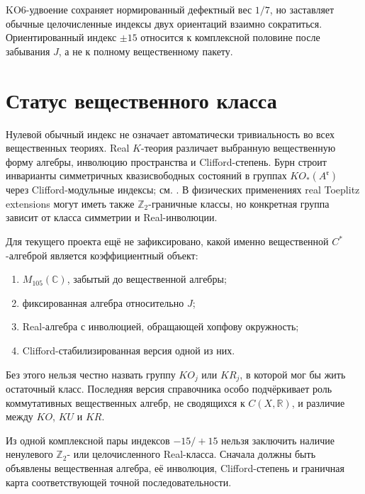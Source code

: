 \begin{proposition}
KO6-удвоение сохраняет нормированный дефектный вес $1/7$, но заставляет
обычные целочисленные индексы двух ориентаций взаимно сократиться.
Ориентированный индекс $\pm15$ относится к комплексной половине после
забывания $J$, а не к полному вещественному пакету.
\end{proposition}

\section{Статус вещественного класса}

Нулевой обычный индекс не означает автоматически тривиальность во всех
вещественных теориях. Real $K$-теория различает выбранную вещественную
форму алгебры, инволюцию пространства и Clifford-степень. Бурн строит
инварианты симметричных квазисвободных состояний в группах
$KO_*(A^{\mathfrak r})$ через Clifford-модульные индексы; см.
. В физических применениях real Toeplitz extensions
могут иметь также $\mathbb Z_2$-граничные классы, но конкретная группа
зависит от класса симметрии и Real-инволюции.

Для текущего проекта ещё не зафиксировано, какой именно вещественной
$C^*$-алгеброй является коэффициентный объект:
\begin{enumerate}
 \item $M_{105}(\mathbb C)$, забытый до вещественной алгебры;
 \item фиксированная алгебра относительно $J$;
 \item Real-алгебра с инволюцией, обращающей хопфову окружность;
 \item Clifford-стабилизированная версия одной из них.
\end{enumerate}
Без этого нельзя честно назвать группу $KO_j$ или $KR_j$, в которой мог
бы жить остаточный класс. Последняя версия справочника
 особо подчёркивает роль коммутативных вещественных
алгебр, не сводящихся к $C(X,\mathbb R)$, и различие между $KO$, $KU$ и
$KR$.

\begin{nogocriterion}
Из одной комплексной пары индексов $-15/+15$ нельзя заключить наличие
ненулевого $\mathbb Z_2$- или целочисленного Real-класса. Сначала должны
быть объявлены вещественная алгебра, её инволюция, Clifford-степень и
граничная карта соответствующей точной последовательности.
\end{nogocriterion}


